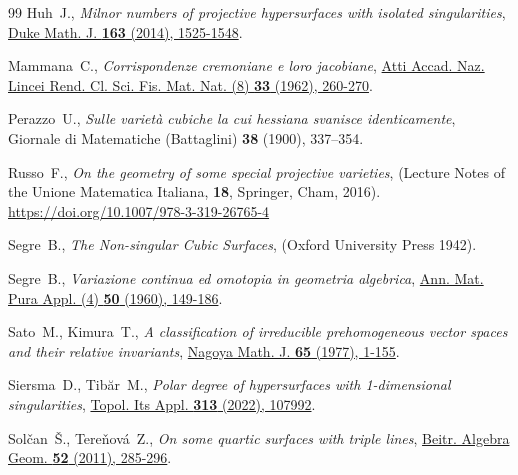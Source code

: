 \documentclass[aps,floatfix,groupedaddress,superscriptaddress,longbibliography,footinbib,notitlepage,showpacs]{revtex4-1}
\begin{document}
\begin{thebibliography}{99}
 {Huh~J.,
\textit{Milnor numbers of projective hypersurfaces with isolated singularities},
{\href{https://doi.org/10.1215/00127094-2713700}{Duke Math. J. \textbf{163} (2014), 1525-1548}}.}

 {Mammana~C.,
\textit{Corrispondenze cremoniane e loro jacobiane},
{\href{http://www.bdim.eu/item?id=RLINA_1962_8_33_5_260_0}{Atti Accad. Naz. Lincei Rend. Cl. Sci. Fis. Mat. Nat. (8) \textbf{33} (1962), 260-270}}.}

 {Perazzo~U.,
\textit{Sulle varietà cubiche la cui hessiana svanisce identicamente},
Giornale di Matematiche (Battaglini) \textbf{38} (1900), 337–354.}

 {Russo~F.,
\textit{On the geometry of some special projective varieties},
(Lecture Notes of the Unione Matematica Italiana, \textbf{18}, Springer, Cham, 2016).} {\href{https://doi.org/10.1007/978-3-319-26765-4}{https://doi.org/10.1007/978-3-319-26765-4}}

 {Segre~B.,
\textit{The Non-singular Cubic Surfaces}, 
(Oxford University Press 1942).}

 {Segre~B.,
\textit{Variazione continua ed omotopia in geometria algebrica},
{\href{https://doi.org/10.1007/BF02414510}{Ann. Mat. Pura Appl. (4) \textbf{50} (1960), 149-186}}.}

 {Sato~M., Kimura~T.,
\textit{A classification of irreducible prehomogeneous vector spaces and their relative invariants},
{\href{https://doi.org/10.1017/S0027763000017633}{Nagoya Math. J. \textbf{65} (1977), 1-155}}.}

 {Siersma~D., Tibăr~M.,
\textit{Polar degree of hypersurfaces with 1-dimensional singularities},
{\href{https://doi.org/10.1016/j.topol.2021.107992}{Topol. Its Appl. \textbf{313} (2022), 107992}}.}

 {Solčan~Š., Tereňová~Z.,
\textit{On some quartic surfaces with triple lines},
{\href{https://doi.org/10.1007/s13366-011-0024-z}{Beitr. Algebra Geom. \textbf{52} (2011), 285-296}}.}


\end{thebibliography}

\end{document}
